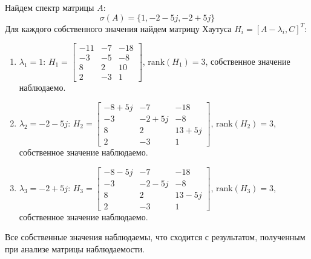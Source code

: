Найдем спектр матрицы $A$:
\begin{equation}
    \sigma(A) = \{1, -2-5j, -2+5j\}
\end{equation}
Для каждого собственного значения найдем матрицу Хаутуса $H_i = [A - \lambda_i, C]^T$:
\begin{enumerate}
    \item $\lambda_1 = 1$: $H_1 = \begin{bmatrix}
        -11 & -7 & -18 \\
        -3 & -5 & -8 \\
        8 & 2 & 10 \\
        2 & -3 & 1
    \end{bmatrix}$, $\text{rank}(H_1) = 3$, собственное значение наблюдаемо.
    \item $\lambda_2 = -2-5j$: $H_2 = \begin{bmatrix}
        -8+5j & -7 & -18 \\
        -3 & -2+5j & -8 \\
        8 & 2 & 13+5j \\
        2 & -3 & 1
    \end{bmatrix}$, $\text{rank}(H_2) = 3$, собственное значение наблюдаемо.
    \item $\lambda_3 = -2+5j$: $H_3 = \begin{bmatrix}
        -8-5j & -7 & -18 \\
        -3 & -2-5j & -8 \\
        8 & 2 & 13-5j \\
        2 & -3 & 1
    \end{bmatrix}$, $\text{rank}(H_3) = 3$, собственное значение наблюдаемо.
\end{enumerate}
Все собственные значения наблюдаемы, что сходится с результатом, полученным при анализе матрицы наблюдаемости.

